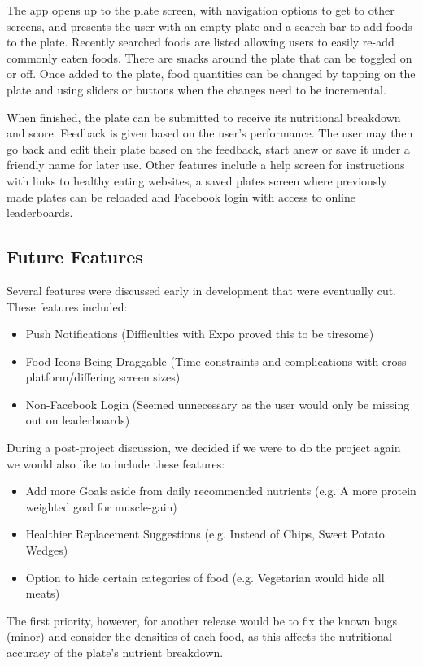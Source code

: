 \documentclass{l3proj}
\begin{document}
The app opens up to the plate screen, with navigation options to get to other screens, and presents the user with an empty plate and a search bar to add foods to the plate. Recently searched foods are listed allowing users to easily re-add commonly eaten foods. There are snacks around the plate that can be toggled on or off. Once added to the plate, food quantities can be changed by tapping on the plate and using sliders or buttons when the changes need to be incremental. 

When finished, the plate can be submitted to receive its nutritional breakdown and score. Feedback is given based on the user's performance. The user may then go back and edit their plate based on the feedback, start anew or save it under a friendly name for later use. Other features include a help screen for instructions with links to healthy eating websites, a saved plates screen where previously made plates can be reloaded and Facebook login with access to online leaderboards.


\subsection{Future Features}
Several features were discussed early in development that were eventually cut. These features included:
\begin{itemize}
    \item Push Notifications (Difficulties with Expo proved this to be tiresome)
    \item Food Icons Being Draggable (Time constraints and complications with cross-platform/differing screen sizes)
    \item Non-Facebook Login (Seemed unnecessary as the user would only be missing out on leaderboards)
\end{itemize}

\noindent During a post-project discussion, we decided if we were to do the project again we would also like to include these features:
\begin{itemize}
    \item Add more Goals aside from daily recommended nutrients (e.g. A more protein weighted goal for muscle-gain)
    \item Healthier Replacement Suggestions (e.g. Instead of Chips, Sweet Potato Wedges)
    \item Option to hide certain categories of food (e.g. Vegetarian would hide all meats)
\end{itemize}
The first priority, however, for another release would be to fix the known bugs (minor) and consider the densities of each food, as this affects the nutritional accuracy of the plate's nutrient breakdown.
\end{document}
